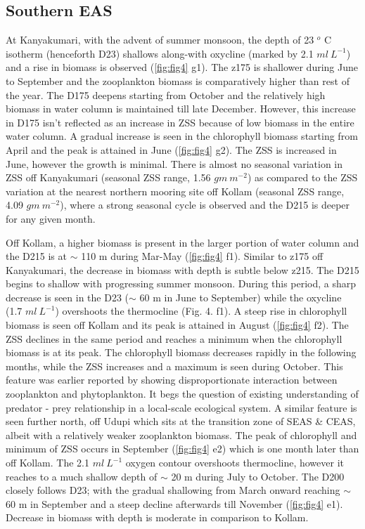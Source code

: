 \documentclass{article}
\begin{document}
	\subsection{Southern EAS}
	At Kanyakumari, with the advent of summer monsoon, the depth of 23 $^o$ C isotherm (henceforth D23) shallows along-with oxycline (marked by 2.1 $ml \ L^{-1}$) and a rise in biomass is observed (\cref{fig:fig4} g1). The z175 is shallower during June to September and the zooplankton biomass is comparatively higher than rest of the year. The D175 deepens starting from October and the relatively high biomass in water column is maintained till late December. However, this increase in D175 isn't reflected as an increase in ZSS because of low biomass in the entire water column. A gradual increase is seen in the chlorophyll biomass starting from April and the peak is attained in June (\cref{fig:fig4} g2). The ZSS is increased in June, however the growth is minimal. There is almost no seasonal variation in ZSS off Kanyakumari (seasonal ZSS range, 1.56 $gm\ m^{-2}$) as compared to the ZSS variation at the nearest northern mooring site off Kollam (seasonal ZSS range, 4.09 $gm\ m^{-2}$), where a strong seasonal cycle is observed and the D215 is deeper for any given month.
	
	Off Kollam, a higher biomass is present in the larger portion of water column and the D215 is at $\sim$ 110 m during Mar-May (\cref{fig:fig4} f1). Similar to z175 off Kanyakumari, the decrease in biomass with depth is subtle below z215. The D215 begins to shallow with progressing summer monsoon. During this period, a sharp decrease is seen in the D23 ($\sim$ 60 m in June to September) while the oxycline (1.7 $ml \ L^{-1}$) overshoots the thermocline (Fig. 4. f1). A steep rise in chlorophyll biomass is seen off Kollam and its peak is attained in August (\cref{fig:fig4} f2). The ZSS declines in the same period and reaches a minimum when the chlorophyll biomass is at its peak. The chlorophyll biomass decreases rapidly in the following months, while the ZSS increases and a maximum is seen during October. This feature was earlier reported by \citep{aparna2022seasonal} showing disproportionate interaction between zooplankton and phytoplankton. It begs the question of existing understanding of predator - prey relationship in a local-scale ecological system. A similar feature is seen further north, off Udupi which sits at the transition zone of SEAS \& CEAS, albeit with a relatively weaker zooplankton biomass. The peak of chlorophyll and minimum of ZSS occurs in September (\cref{fig:fig4} e2) which is one month later than off Kollam. The 2.1 $ml \ L^{-1}$  oxygen contour overshoots thermocline, however it reaches to a much shallow depth of $\sim$ 20 m during July to October. The D200 closely follows D23; with the gradual shallowing from March onward reaching $\sim$ 60 m in September and a steep decline afterwards till November (\cref{fig:fig4} e1). Decrease in biomass with depth is moderate in comparison to Kollam.
	
\end{document}
